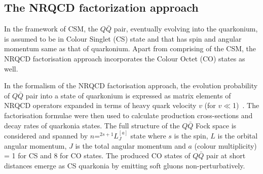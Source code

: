 \subsection{The NRQCD factorization approach}


In the framework of CSM, the $Q\bar{Q}$ pair, eventually evolving into the quarkonium,
is assumed to be in Colour Singlet (CS) state and that has spin and 
angular momentum same as that of quarkonium.
Apart from comprising of the CSM, the NRQCD factorisation approach incorporates 
the Colour Octet (CO) states as well.

In the formalism of the NRQCD factorisation approach, the evolution probability of $Q\bar{Q}$
pair into a state of quarkonium is expressed as matrix elements of NRQCD operators expanded
in terms of heavy quark velocity $v$ (for $v\ll$1)~\cite{Bodwin:1994jh}.
The factorisation formulae were then used to calculate production cross-sections
and decay rates of quarkonia states.
The full structure of the $Q\bar{Q}$ Fock space
is considered and spanned by $n$=$^{2s+1}L_J^{[a]}$ state where $s$
is the spin, $L$ is the orbital angular momentum, $J$ is the total angular momentum
and $a$ (colour multiplicity) = 1 for CS and 8 for CO states. 
The produced CO states of $Q\bar{Q}$ pair at short distances emerge as 
CS quarkonia by emitting soft gluons non-perturbatively.

